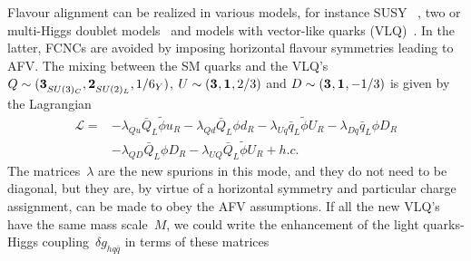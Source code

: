 Flavour alignment can be realized in various models, for instance SUSY ~\cite{Nir:1993mx,Leurer:1993gy}, two or multi-Higgs doublet models~\cite{Branco:1996bq,Penuelas:2017ikk} and models with vector-like quarks (VLQ)~\cite{Bar-Shalom:2018rjs}.  In the latter,
FCNCs are avoided by imposing horizontal flavour symmetries leading to AFV. 
The mixing between the SM quarks and the VLQ's $Q\sim (\irrep{3}_{SU(3)_C},\irrep{2}_{SU(2)_L},1/6_Y)$, $U\sim(\irrep{3},\irrep{1},2/3)$ and $D\sim(\irrep{3},\irrep{1},-1/3)$ is given by the Lagrangian 
\begin{equation}
	\begin{split}
		\mathcal{L}=&-\lambda_{Qu} \bar{Q}_L \tilde{\phi} u_R -\lambda_{Qd} \bar{Q}_L \phi d_R-\lambda_{Uq} \bar{q}_L \tilde{\phi} U_R -\lambda_{Dq} \bar{q}_L \phi D_R \\ &-\lambda_{QD}\bar{Q}_L \phi D_R-\lambda_{UQ} \bar{Q}_L \tilde{\phi} U_R+h.c.
	\end{split}
\end{equation}
The matrices~$\lambda$ are the new spurions in this mode, and they do not need to be diagonal, but they are, by virtue of a horizontal symmetry and particular charge assignment, can be made to obey the AFV assumptions.  If all the new VLQ's have the same mass scale~$M$, we could write the enhancement of the light quarks-Higgs coupling~$\delta g_{h q\bar{q}}$ in terms of these matrices
